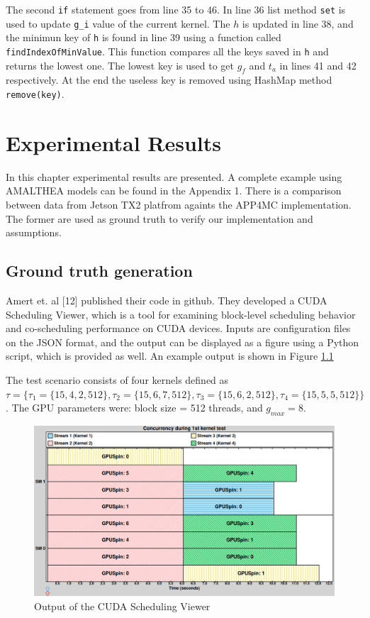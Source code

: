 \documentclass[
  12pt,
  a4paperpaper,
]{report}
\begin{document}
The second \texttt{if} statement goes from line 35 to 46. 
In line 36 list method \texttt{set} is used to update \texttt{g\_i} value of the current kernel.
The \(h\) is updated in line 38, and the minimun key of \texttt{h} is found in line 39 using a function called \texttt{findIndexOfMinValue}. This function compares all the keys saved in \texttt{h} and returns the lowest one.
The lowest key is used to get \(g_f\) and \(t_a\) in lines 41 and 42 respectively. 
At the end the useless key is removed using HashMap method \texttt{remove(key)}.

\hypertarget{experimental-results}{%
\chapter{Experimental Results}\label{experimental-results}}

In this chapter experimental results are presented. A complete example
using AMALTHEA models can be found in the Appendix 1. There is a comparison 
between data from Jetson TX2 platfrom againts the APP4MC implementation. The former
are used as ground truth to verify our implementation and assumptions.

\hypertarget{ground-truth-generation}{%
\section{Ground truth generation}\label{ground-truth-generation}}

Amert et. al {[}12{]} published their code in github. They developed a
CUDA Scheduling Viewer, which is a tool for examining block-level
scheduling behavior and co-scheduling performance on CUDA devices. 
Inputs are configuration files on the JSON format, and the output can be
displayed as a figure using a Python script, which is provided as well. An
example output is shown in Figure \ref{img:nvidia-base}

The test scenario consists of four kernels defined as \(\tau = \{\tau_1 = \{15, 4, 2, 512\} , \tau_2 = \{15, 6,7,512\}, \tau_3 = \{15, 6,2,512\}, \tau_4 =\{ 15, 5,5,512\} \}\).
The GPU parameters were: block size = 512 threads, and \(g_{max} = 8\).

\begin{figure}
\centering
\includegraphics{source/figures/nvidia/base.png}
\caption{Output of the CUDA Scheduling Viewer \label{img:nvidia-base}}
\end{figure}
\end{document}

